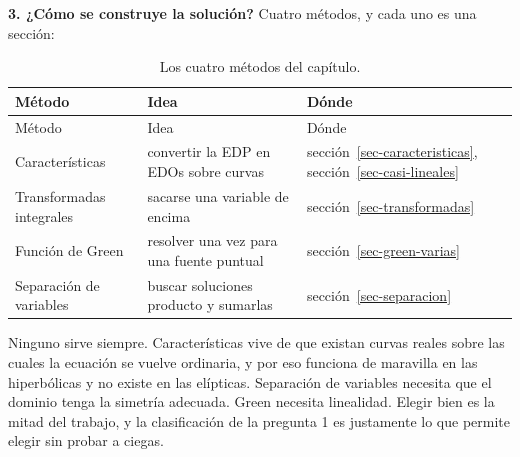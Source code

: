 \documentclass[
  spanish,
  a4paper,
]{scrbook}
\theoremstyle{definition}
\theoremstyle{plain}
\theoremstyle{definition}
\theoremstyle{plain}
\theoremstyle{definition}
\theoremstyle{remark}
\begin{document}
\textbf{3. ¿Cómo se construye la solución?} Cuatro métodos, y cada uno
es una sección:

\begin{longtable}[]{@{}
  >{\raggedright\arraybackslash}p{}
  >{\raggedright\arraybackslash}p{}
  >{\raggedright\arraybackslash}p{}@{}}
\caption{Los cuatro métodos del
capítulo.}\label{tbl-metodos}\tabularnewline
\toprule\noalign{}
\begin{minipage}[b]{\linewidth}\raggedright
Método
\end{minipage} & \begin{minipage}[b]{\linewidth}\raggedright
Idea
\end{minipage} & \begin{minipage}[b]{\linewidth}\raggedright
Dónde
\end{minipage} \\
\midrule\noalign{}
\endfirsthead
\toprule\noalign{}
\begin{minipage}[b]{\linewidth}\raggedright
Método
\end{minipage} & \begin{minipage}[b]{\linewidth}\raggedright
Idea
\end{minipage} & \begin{minipage}[b]{\linewidth}\raggedright
Dónde
\end{minipage} \\
\midrule\noalign{}
\endhead
\bottomrule\noalign{}
\endlastfoot
Características & convertir la EDP en EDOs sobre curvas &
sección~\ref{sec-caracteristicas}, sección~\ref{sec-casi-lineales} \\
Transformadas integrales & sacarse una variable de encima &
sección~\ref{sec-transformadas} \\
Función de Green & resolver una vez para una fuente puntual &
sección~\ref{sec-green-varias} \\
Separación de variables & buscar soluciones producto y sumarlas &
sección~\ref{sec-separacion} \\
\end{longtable}

Ninguno sirve siempre. Características vive de que existan curvas reales
sobre las cuales la ecuación se vuelve ordinaria, y por eso funciona de
maravilla en las hiperbólicas y no existe en las elípticas. Separación
de variables necesita que el dominio tenga la simetría adecuada. Green
necesita linealidad. Elegir bien es la mitad del trabajo, y la
clasificación de la pregunta 1 es justamente lo que permite elegir sin
probar a ciegas.
\end{document}
